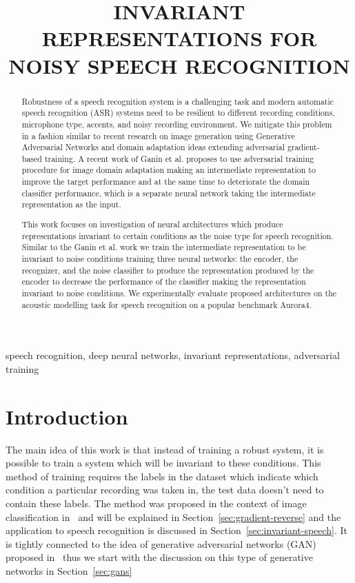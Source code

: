 \documentclass{article}
\title{INVARIANT REPRESENTATIONS FOR NOISY SPEECH RECOGNITION}
\begin{document}
%
\maketitle
%
\begin{abstract}
    Robustness of a speech recognition system is a challenging task and modern
    automatic speech recognition (ASR) systems need to be resilient to different recording conditions,
    microphone type, accents, and noisy recording environment. We mitigate
    this problem in a fashion similar to recent research on image generation using
    Generative Adversarial Networks and domain adaptation ideas extending
    adversarial gradient-based training. A recent work of Ganin et al. proposes to
    use adversarial training procedure for image domain adaptation making an intermediate
    representation to improve the target performance and at the same time
    to deteriorate the domain classifier performance, which is a separate neural
    network taking the intermediate representation as the input.

    This work focuses on investigation of neural architectures which produce
    representations invariant to certain conditions as the noise type for speech
    recognition. Similar
    to the Ganin et al. work we train the intermediate representation to be invariant
    to noise conditions training three neural networks: the encoder, the recognizer, and the
    noise classifier to produce the representation produced by the encoder to decrease
    the performance of the classifier making the representation invariant to noise conditions. We
    experimentally evaluate proposed architectures on the acoustic modelling task
    for speech recognition on a popular benchmark Aurora4.
\end{abstract}
%
\begin{keywords}
speech recognition, deep neural networks, invariant representations, adversarial training
\end{keywords}
%
\section{Introduction}
\label{sec:intro}

    The main idea of this work is that instead of training a robust system,
    it is possible to train a system which will be invariant to these 
    conditions. This method of training requires the labels in the dataset
    which indicate which condition a particular recording was taken in, the 
    test data doesn't need to contain these labels. The method was proposed in
    the context of image classification in~\cite{ganin2014unsupervised} and 
    will be explained in Section~\ref{sec:gradient-reverse} and the application 
    to speech recognition is discussed
    in Section~\ref{sec:invariant-speech}. It is tightly connected to the idea
    of generative adversarial networks (GAN) proposed 
    in~\cite{goodfellow2014generative} thus we start with the discussion
    on this type of generative networks in Section~\ref{sec:gans}
\end{document}
